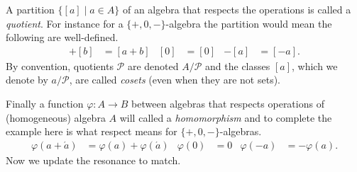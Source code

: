 A partition $\{[a]\mid a\in A\}$ of an algebra that respects the operations is called a \emph{quotient}.
For instance for a $\{+,0,-\}$-algebra the partition would mean the following are well-defined.
\begin{align*}
    [a]+[b] & = [a+b] 
    & 
    [0] & = [0] 
    &
    -[a] & = [-a].
\end{align*}
By convention, quotients $\mathcal{P}$ are denoted $A/\mathcal{P}$ and the classes $[a]$, which we denote 
by $a/\mathcal{P}$, are called \emph{cosets} (even when they are not sets).

Finally a function $\varphi:A\to B$ between algebras that respects operations of (homogeneous) algebra $A$ will called a 
\emph{homomorphism} and to complete the example here is what respect means for $\{+,0,-\}$-algebras.
\begin{align*}
    \varphi(a+\acute{a}) & = \varphi(a)+\varphi(\acute{a})
    & 
    \varphi(0) & = 0
    &
    \varphi(-a) & = -\varphi(a).
\end{align*}
Now we update the resonance to match.

